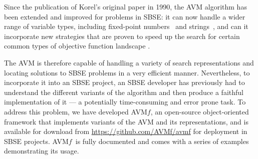 \documentclass{llncs}
\newcommand{\name}{AVM\hspace{-1pt}$f$\xspace}
\newcommand{\repourl}{\url{https://github.com/AVMf/avmf}\xspace}
\begin{document}

Since the publication of Korel's original paper in 1990, the AVM algorithm has been extended and improved for problems in SBSE: it can now handle a wider range of variable types, including fixed-point numbers~\cite{Harman2007} and strings~\cite{McMinn2015}, and can it incorporate new strategies that are proven to speed up the search for certain common types of objective function landscape \cite{Kempka2013,Kempka2015}.

The AVM is therefore capable of handling a variety of search representations and locating solutions to SBSE problems in a very efficient manner. Nevertheless, to incorporate it into an SBSE project, an SBSE developer has previously had to understand the different variants of the algorithm and then produce a faithful implementation of it --- a potentially time-consuming and error prone task. To address this problem, we have developed \name, an open-source object-oriented framework that implements variants of the AVM and its representations, and is available for download
from \repourl for  deployment in SBSE projects. \name~is fully documented and comes with a series of examples demonstrating its usage.


\end{document}
